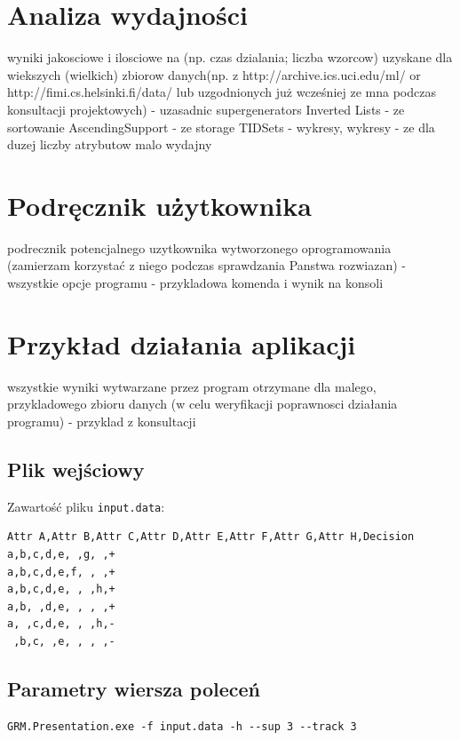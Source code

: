 \documentclass[a4paper,10pt]{article}
\begin{document}
\section{Analiza wydajności}
wyniki jakosciowe i ilosciowe na (np. czas dzialania; liczba wzorcow)
uzyskane dla wiekszych (wielkich) zbiorow danych(np. z
http://archive.ics.uci.edu/ml/ or http://fimi.cs.helsinki.fi/data/ lub
uzgodnionych już wcześniej ze mna podczas konsultacji projektowych)
- uzasadnic supergenerators Inverted Lists
- ze sortowanie AscendingSupport
- ze storage TIDSets
- wykresy, wykresy
- ze dla duzej liczby atrybutow malo wydajny


 
\section{Podręcznik użytkownika}
podrecznik potencjalnego uzytkownika wytworzonego oprogramowania
(zamierzam korzystać z niego podczas sprawdzania Panstwa rozwiazan)
- wszystkie opcje programu
- przykladowa komenda i wynik na konsoli



\section{Przykład działania aplikacji}
wszystkie wyniki wytwarzane przez program otrzymane dla malego,
przykladowego zbioru danych (w celu weryfikacji poprawnosci działania
programu)
- przyklad z konsultacji


 \subsection{Plik wejściowy}
 Zawartość pliku \verb+input.data+:

\begin{verbatim}
Attr A,Attr B,Attr C,Attr D,Attr E,Attr F,Attr G,Attr H,Decision
a,b,c,d,e, ,g, ,+
a,b,c,d,e,f, , ,+
a,b,c,d,e, , ,h,+
a,b, ,d,e, , , ,+
a, ,c,d,e, , ,h,-
 ,b,c, ,e, , , ,-
\end{verbatim}


 \subsection{Parametry wiersza poleceń}

\begin{verbatim}
GRM.Presentation.exe -f input.data -h --sup 3 --track 3
\end{verbatim}
\end{document}
